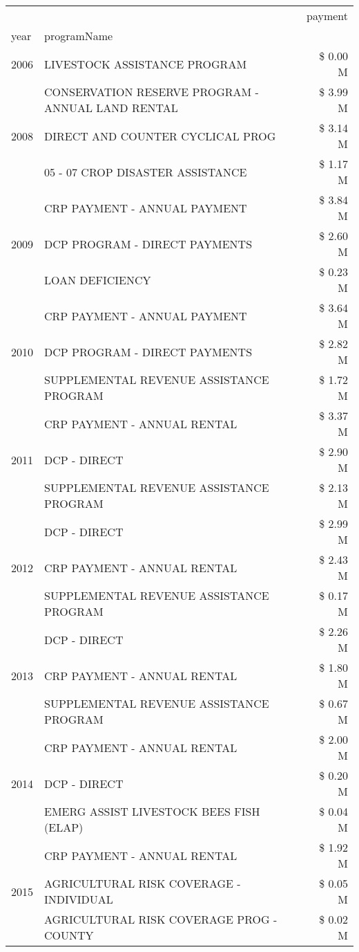 \begin{tabular}{llr}
\toprule
 &  & payment \\
year & programName &  \\
\midrule
2006 & LIVESTOCK ASSISTANCE PROGRAM & \$ 0.00 M \\
\cline{1-3}
\multirow[t]{3}{*}{2008} & CONSERVATION RESERVE PROGRAM - ANNUAL LAND RENTAL & \$ 3.99 M \\
 & DIRECT AND COUNTER CYCLICAL PROG & \$ 3.14 M \\
 & 05 - 07 CROP DISASTER ASSISTANCE & \$ 1.17 M \\
\cline{1-3}
\multirow[t]{3}{*}{2009} & CRP PAYMENT - ANNUAL PAYMENT & \$ 3.84 M \\
 & DCP PROGRAM - DIRECT PAYMENTS & \$ 2.60 M \\
 & LOAN DEFICIENCY & \$ 0.23 M \\
\cline{1-3}
\multirow[t]{3}{*}{2010} & CRP PAYMENT - ANNUAL PAYMENT & \$ 3.64 M \\
 & DCP PROGRAM - DIRECT PAYMENTS & \$ 2.82 M \\
 & SUPPLEMENTAL REVENUE ASSISTANCE PROGRAM & \$ 1.72 M \\
\cline{1-3}
\multirow[t]{3}{*}{2011} & CRP PAYMENT - ANNUAL RENTAL & \$ 3.37 M \\
 & DCP - DIRECT & \$ 2.90 M \\
 & SUPPLEMENTAL REVENUE ASSISTANCE PROGRAM & \$ 2.13 M \\
\cline{1-3}
\multirow[t]{3}{*}{2012} & DCP - DIRECT & \$ 2.99 M \\
 & CRP PAYMENT - ANNUAL RENTAL & \$ 2.43 M \\
 & SUPPLEMENTAL REVENUE ASSISTANCE PROGRAM & \$ 0.17 M \\
\cline{1-3}
\multirow[t]{3}{*}{2013} & DCP - DIRECT & \$ 2.26 M \\
 & CRP PAYMENT - ANNUAL RENTAL & \$ 1.80 M \\
 & SUPPLEMENTAL REVENUE ASSISTANCE PROGRAM & \$ 0.67 M \\
\cline{1-3}
\multirow[t]{3}{*}{2014} & CRP PAYMENT - ANNUAL RENTAL & \$ 2.00 M \\
 & DCP - DIRECT & \$ 0.20 M \\
 & EMERG ASSIST LIVESTOCK BEES FISH (ELAP) & \$ 0.04 M \\
\cline{1-3}
\multirow[t]{3}{*}{2015} & CRP PAYMENT - ANNUAL RENTAL & \$ 1.92 M \\
 & AGRICULTURAL RISK COVERAGE - INDIVIDUAL & \$ 0.05 M \\
 & AGRICULTURAL RISK COVERAGE PROG - COUNTY & \$ 0.02 M \\

\end{tabular}
